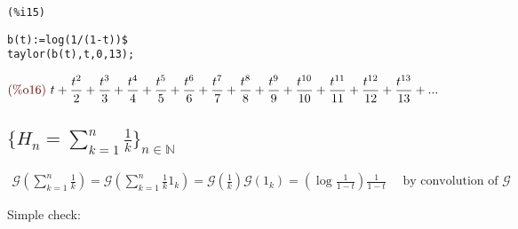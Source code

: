 \noindent
\begin{minipage}[t]{8ex}{\color{red}\bf
\begin{verbatim}
(%i15) 
\end{verbatim}}
\end{minipage}
\begin{minipage}[t]{\textwidth}{\color{blue}
\begin{verbatim}
b(t):=log(1/(1-t))$
taylor(b(t),t,0,13);
\end{verbatim}}
\end{minipage}
\begin{math}\displaystyle
\parbox{8ex}{\color{labelcolor}(\%o16) }
t+\frac{{t}^{2}}{2}+\frac{{t}^{3}}{3}+\frac{{t}^{4}}{4}+\frac{{t}^{5}}{5}+\frac{{t}^{6}}{6}+\frac{{t}^{7}}{7}+\frac{{t}^{8}}{8}+\frac{{t}^{9}}{9}+\frac{{t}^{10}}{10}+\frac{{t}^{11}}{11}+\frac{{t}^{12}}{12}+\frac{{t}^{13}}{13}+...
\end{math}

\subsection{$\{H_n = \sum_{k=1}^{n}{ \frac{1}{k} } \}_{n\in \mathbb{N}
  } $}

\begin{displaymath}
  \begin{split}
    \mathcal{G} (\sum_{k=1}^{n}{ \frac{1}{k} } ) = \mathcal{G}
    (\sum_{k=1}^{n}{ \frac{1}{k} 1_k } ) = \mathcal{G} (\frac{1}{k})
    \mathcal{G} (1_k) = \left (\log{ \frac{1}{1-t}}\right)
    \frac{1}{1-t} \quad \text{ by convolution of }\mathcal{G}
  \end{split}
\end{displaymath}

Simple check:

